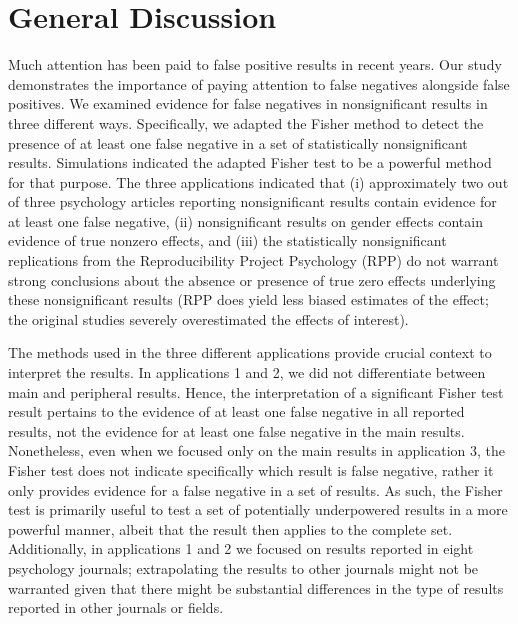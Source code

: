 \documentclass[a5paper]{book}
\begin{document}
\section{General Discussion}\label{general-discussion}

Much attention has been paid to false positive results in recent years.
Our study demonstrates the importance of paying attention to false
negatives alongside false positives. We examined evidence for false
negatives in nonsignificant results in three different ways.
Specifically, we adapted the Fisher method to detect the presence of at
least one false negative in a set of statistically nonsignificant
results. Simulations indicated the adapted Fisher test to be a powerful
method for that purpose. The three applications indicated that (i)
approximately two out of three psychology articles reporting
nonsignificant results contain evidence for at least one false negative,
(ii) nonsignificant results on gender effects contain evidence of true
nonzero effects, and (iii) the statistically nonsignificant replications
from the Reproducibility Project Psychology (RPP) do not warrant strong
conclusions about the absence or presence of true zero effects
underlying these nonsignificant results (RPP does yield less biased
estimates of the effect; the original studies severely overestimated the
effects of interest).

The methods used in the three different applications provide crucial
context to interpret the results. In applications 1 and 2, we did not
differentiate between main and peripheral results. Hence, the
interpretation of a significant Fisher test result pertains to the
evidence of at least one false negative in all reported results, not the
evidence for at least one false negative in the main results.
Nonetheless, even when we focused only on the main results in
application 3, the Fisher test does not indicate specifically which
result is false negative, rather it only provides evidence for a false
negative in a set of results. As such, the Fisher test is primarily
useful to test a set of potentially underpowered results in a more
powerful manner, albeit that the result then applies to the complete
set. Additionally, in applications 1 and 2 we focused on results
reported in eight psychology journals; extrapolating the results to
other journals might not be warranted given that there might be
substantial differences in the type of results reported in other
journals or fields.
\end{document}

